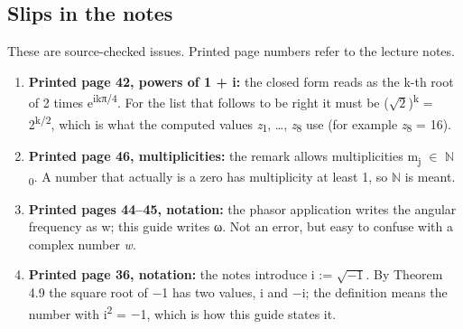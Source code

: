 \documentclass[11pt]{article}
\begin{document}
\begin{keepsection}
\section{Slips in the notes}

These are source-checked issues. Printed page numbers refer to the lecture notes.

\begin{enumerate}
\item \textbf{Printed page 42, powers of 1 + i:} the closed form reads as the k-th root of 2 times e\textsuperscript{ikπ/4}. For the list that follows to be right it must be (\ensuremath{\sqrt{2}})\textsuperscript{k} = 2\textsuperscript{k/2}, which is what the computed values \textit{z}\textsubscript{1}, …, \textit{z}\textsubscript{8} use (for example \textit{z}\textsubscript{8} = 16).
\item \textbf{Printed page 46, multiplicities:} the remark allows multiplicities m\textsubscript{j} \ensuremath{\in} \ensuremath{\mathbb{N}}\textsubscript{0}. A number that actually is a zero has multiplicity at least 1, so \ensuremath{\mathbb{N}} is meant.
\item \textbf{Printed pages 44–45, notation:} the phasor application writes the angular frequency as w; this guide writes ω. Not an error, but easy to confuse with a complex number \textit{w}.
\item \textbf{Printed page 36, notation:} the notes introduce i := \ensuremath{\sqrt{-1}}. By Theorem 4.9 the square root of \ensuremath{-}1 has two values, i and \ensuremath{-}i; the definition means the number with i\textsuperscript{2} = \ensuremath{-}1, which is how this guide states it.
\end{enumerate}
\end{keepsection}
\end{document}
